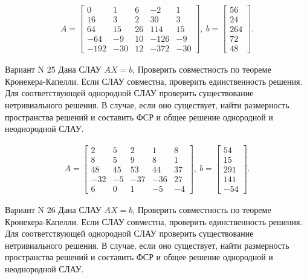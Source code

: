 \documentclass[11pt]{report}
\begin{document}
\begin{align*}
 A = \left[\begin{matrix}0 & 1 & 6 & -2 & 1\\16 & 3 & 2 & 30 & 3\\64 & 15 & 26 & 114 & 15\\-64 & -9 & 10 & -126 & -9\\-192 & -30 & 12 & -372 & -30\end{matrix}\right],
\ b = \left[\begin{matrix}56\\24\\264\\72\\48\end{matrix}\right]. 
 \end{align*}

Вариант N 25
Дана СЛАУ $AX = b$,
Проверить совместность по теореме Кронекера-Капелли. Если СЛАУ совместна, проверить единственность решения.
Для соответствующей однородной СЛАУ проверить существование нетривиального решения. В случае, если оно существует,
найти размерность пространства решений и составить ФСР и общее решение однородной  и неоднородной СЛАУ.


\begin{align*}
 A = \left[\begin{matrix}2 & 5 & 2 & 1 & 8\\8 & 5 & 9 & 8 & 1\\48 & 45 & 53 & 44 & 37\\-32 & -5 & -37 & -36 & 27\\6 & 0 & 1 & -5 & -4\end{matrix}\right],
\ b = \left[\begin{matrix}54\\15\\291\\141\\-54\end{matrix}\right]. 
 \end{align*}

Вариант N 26
Дана СЛАУ $AX = b$,
Проверить совместность по теореме Кронекера-Капелли. Если СЛАУ совместна, проверить единственность решения.
Для соответствующей однородной СЛАУ проверить существование нетривиального решения. В случае, если оно существует,
найти размерность пространства решений и составить ФСР и общее решение однородной  и неоднородной СЛАУ.
\end{document}
